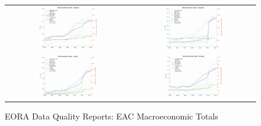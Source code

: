 \documentclass[a4paper]{article}
\begin{document}
\begin{figure} \centering
\caption{EORA Data Quality Reports: EAC Macroeconomic Totals}
\label{fig:EORADQMT}
\vspace{2mm}
\begin{tabular}{cc}
\includegraphics[width=0.5\textwidth, trim= {0 0 0 0}, clip]{"DataQuality_UGA.png"} & \includegraphics[width=0.52\textwidth, trim= {0 0 0 0}, clip]{"DataQuality_TZA.png"} \\
\includegraphics[width=0.5\textwidth, trim= {0 0 0 0}, clip]{"DataQuality_KEN.png"} & \includegraphics[width=0.5\textwidth, trim= {0 0 0 0}, clip]{"DataQuality_RWA.png"} \\

\end{tabular}
\end{figure}
\end{document}
